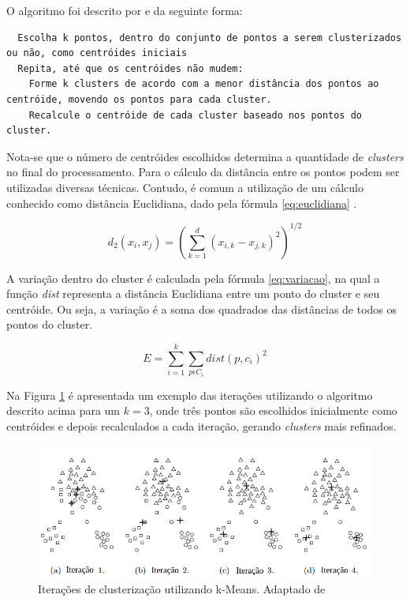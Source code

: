 O algoritmo foi descrito por  e  da seguinte forma:


\begin{center}
  \lstset{language=HTML, numbers=left, stepnumber=1}
  \begin{lstlisting}
  Escolha k pontos, dentro do conjunto de pontos a serem clusterizados ou não, como centróides iniciais
  Repita, até que os centróides não mudem:
    Forme k clusters de acordo com a menor distância dos pontos ao centróide, movendo os pontos para cada cluster.
    Recalcule o centróide de cada cluster baseado nos pontos do cluster.
  \end{lstlisting}
\end{center}


Nota-se que o número de centróides escolhidos determina a quantidade de \textit{clusters} no final do processamento.
Para o cálculo da distância entre os pontos podem ser utilizadas diversas técnicas. Contudo, é comum a utilização de um cálculo conhecido como distância Euclidiana, 
dado pela fórmula \ref{eq:euclidiana} \cite{clustering_review, tan2013data, han2011data}.

\begin{equation} \label{eq:euclidiana}
  d_{2}(x_i, x_j) = (\sum_{k=1}^{d} (x_{i,k} - x_{j,k})^2)^{1/2}
\end{equation}

A variação dentro do cluster é calculada pela fórmula \ref{eq:variacao}, na qual a 
função \textit{dist} representa a distância Euclidiana entre um ponto do
cluster e seu centróide. Ou seja, a variação é a soma dos quadrados
das distâncias de todos os pontos do cluster.

\begin{equation} \label{eq:variacao}
  E = \sum_{i=1}^{k} \sum_{p \epsilon C_{i}} dist(p, c_i)^2
\end{equation}

Na Figura \ref{fig:iteracoes_kmeans} é apresentada um exemplo das iterações utilizando o algoritmo descrito acima para um $k = 3$,
onde três pontos são escolhidos inicialmente como centróides e depois recalculados a cada iteração, gerando \textit{clusters} mais
refinados.

\begin{figure}[h!]
\centering
\includegraphics[scale=0.6]{figuras/iteracoes_kmeans.png}
\caption{Iterações de clusterização utilizando k-Means. Adaptado de }
\label{fig:iteracoes_kmeans}
\end{figure}

